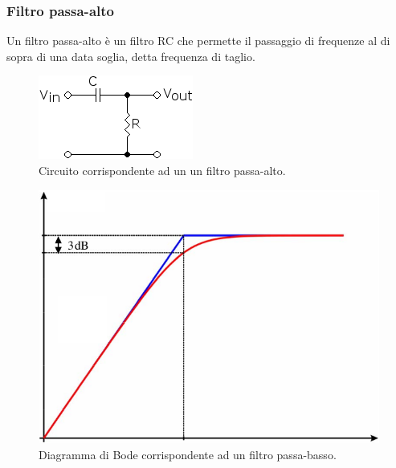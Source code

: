 \documentclass{article}
\begin{document}
			\subsubsection{Filtro passa-alto}
				Un filtro passa-alto è un filtro RC che permette il passaggio di frequenze al di sopra di una data soglia, detta frequenza di taglio.
				\begin{figure}[h!]
					\centering
					\includegraphics[scale=0.6]{filtroPassaAlto}
					\caption{Circuito corrispondente ad un un filtro passa-alto.}
					\label{fig:filtroPassaAlto}
				\end{figure}
				\newline
				\begin{figure}[h!]
					\centering
					\includegraphics[scale=0.4]{filtroPassaAltoBode}
					\caption{Diagramma di Bode corrispondente ad un filtro passa-basso.}
					\label{fig:filtroPassaAltoBode}
				\end{figure}
				\newpage
\end{document}
